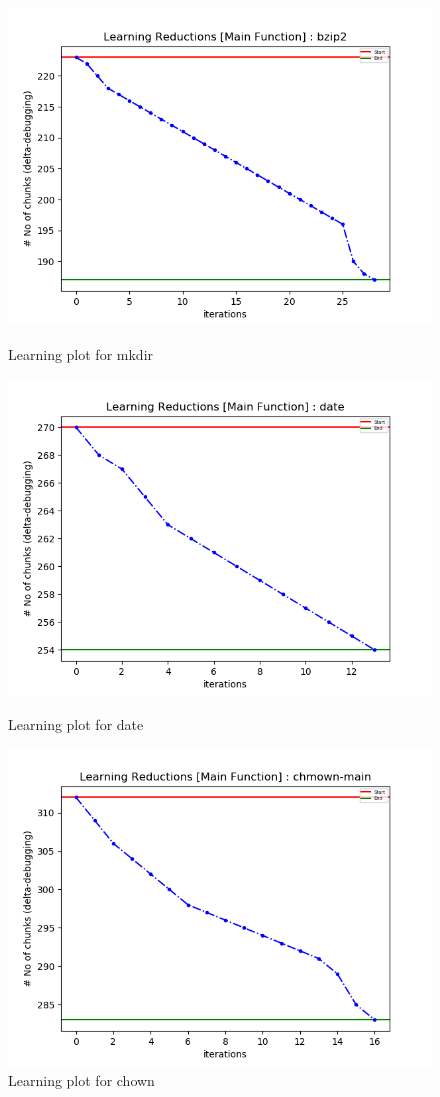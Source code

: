 \documentclass{relatorio}
\begin{document}
	\begin{figure}[H]
		\centering
		\captionsetup{justification=centering}
		\includegraphics[width=0.65\linewidth]{imgs/chisel_learning_mkdir_plot.png}
		\caption{Learning plot for \color{blue} mkdir}%
		\label{fig:plant}
		\centering
		\captionsetup{justification=centering}
		\includegraphics[width=0.65\linewidth]{imgs/chisel_learning_date_plot.png}
		\caption{Learning plot for \color{blue} date}%
		\label{fig:plant}
		\centering
		\captionsetup{justification=centering}
		\includegraphics[width=0.65\linewidth]{imgs/chisel_learning_chmown-main_plot.png}
		\caption{Learning plot for \color{blue} chown}%
		\label{fig:plant}
		\centering
		\captionsetup{justification=centering}

\end{figure}
\end{document}
